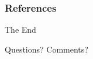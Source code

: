 \documentclass[
	11pt, %
]{beamer}
\begin{document}

\begin{frame}[allowframebreaks]%
	\frametitle{References}
    \printbibliography
\end{frame}




\begin{frame}[plain] %
	\begin{center}
		{\Huge The End}
		
		\bigskip\bigskip %
		
		{\LARGE Questions? Comments?}
	\end{center}
\end{frame}

\end{document}

